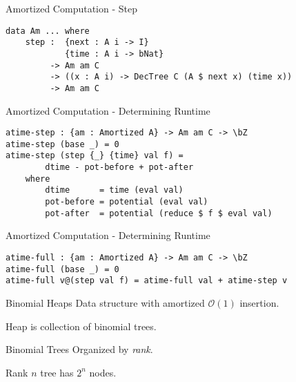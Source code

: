 \documentclass[11pt]{beamer}
\begin{document}
    \begin{frame}[fragile]{Amortized Computation - Step}
        \begin{lstlisting}[emph={Am,step}]
data Am ... where
    step :  {next : A i -> I}
            {time : A i -> bNat}
         -> Am am C
         -> ((x : A i) -> DecTree C (A $ next x) (time x))
         -> Am am C
        \end{lstlisting}
    \end{frame}

    \begin{frame}[fragile]{Amortized Computation - Determining Runtime}
        \begin{lstlisting}[emph={atime,step,base}]
atime-step : {am : Amortized A} -> Am am C -> \bZ
atime-step (base _) = 0
atime-step (step {_} {time} val f) =
        dtime - pot-before + pot-after
    where
        dtime      = time (eval val)
        pot-before = potential (eval val)
        pot-after  = potential (reduce $ f $ eval val)
        \end{lstlisting}
    \end{frame}

    \begin{frame}[fragile]{Amortized Computation - Determining Runtime}
        \begin{lstlisting}[emph={atime,full}]
atime-full : {am : Amortized A} -> Am am C -> \bZ
atime-full (base _) = 0
atime-full v@(step val f) = atime-full val + atime-step v
        \end{lstlisting}
    \end{frame}

    \begin{frame}{Binomial Heaps}
        Data structure with amortized $\mathcal O(1)$ insertion.

        Heap is collection of binomial trees.
    \end{frame}

    \begin{frame}{Binomial Trees}
        Organized by \emph{rank}.

        Rank $n$ tree has $2^n$ nodes.
    \end{frame}

\end{document}
